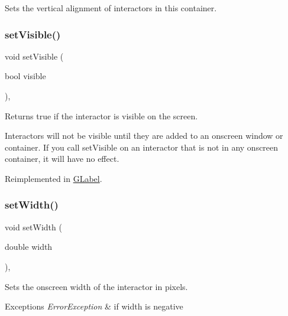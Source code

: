 Sets the vertical alignment of interactors in this container. 

\mbox{\label{classGInteractor_a18e44e30b31525a243960ca3928125aa}} 
\subsubsection{\texorpdfstring{set\+Visible()}{setVisible()}}
{\footnotesize\ttfamily void set\+Visible (\begin{DoxyParamCaption}\item[{bool}]{visible }\end{DoxyParamCaption})\hspace{0.3cm}{\ttfamily [virtual]}, {\ttfamily [inherited]}}



Returns true if the interactor is visible on the screen. 

Interactors will not be visible until they are added to an onscreen window or container. If you call set\+Visible on an interactor that is not in any onscreen container, it will have no effect. 

Reimplemented in \mbox{\hyperlink{classGLabel_afcc2a51afef8e2e61d8d9191386fb93f}{G\+Label}}.

\mbox{\label{classGInteractor_aa3f3fba4cb131baa8696ba01e3bceca1}} 
\subsubsection{\texorpdfstring{set\+Width()}{setWidth()}}
{\footnotesize\ttfamily void set\+Width (\begin{DoxyParamCaption}\item[{double}]{width }\end{DoxyParamCaption})\hspace{0.3cm}{\ttfamily [virtual]}, {\ttfamily [inherited]}}



Sets the onscreen width of the interactor in pixels. 


\begin{DoxyExceptions}{Exceptions}
{\em Error\+Exception} & if width is negative \\
\hline
\end{DoxyExceptions}



